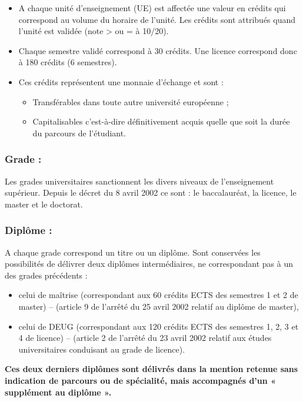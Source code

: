 \documentclass[10pt, a5paper]{report}
\begin{document}
\begin{spacing}{1.5}
\begin{itemize}
\item A chaque unité d’enseignement (UE) est affectée une valeur en crédits qui correspond au volume du horaire de l’unité. Les crédits sont attribués quand l’unité est validée (note > ou = à 10/20).
\item Chaque semestre validé correspond à 30 crédits. Une licence correspond donc à 180 crédits (6 semestres).
\item Ces crédits représentent une monnaie d’échange et sont : 
\begin{itemize}
\item Transférables dans toute autre université européenne ;
\item Capitalisables c’est-à-dire définitivement acquis quelle que soit la durée du parcours de l’étudiant. 
\end{itemize}
\end{itemize}

\subsubsection*{Grade :}

Les grades universitaires sanctionnent les divers niveaux de l’enseignement supérieur. Depuis le décret du 8 avril 2002 ce sont : le baccalauréat, la licence, le master et le doctorat.

\subsubsection*{Diplôme :}

A chaque grade correspond un titre ou un diplôme. Sont conservées les possibilités de délivrer deux diplômes intermédiaires, ne correspondant pas à un des grades précédents :
\begin{itemize}
\item celui de maîtrise (correspondant aux 60 crédits ECTS des semestres 1 et 2 de master) – (article 9 de l’arrêté du 25 avril 2002 relatif au diplôme de master),
\item celui de DEUG (correspondant aux 120 crédits ECTS des semestres 1, 2, 3 et 4 de licence) – (article 2 de l’arrêté du 23 avril 2002 relatif aux études universitaires conduisant au grade de licence).
\end{itemize}

\textbf{Ces deux derniers diplômes sont délivrés dans la mention retenue sans indication de parcours ou de spécialité, mais accompagnés d’un « supplément au diplôme ».}


\end{spacing}
\end{document}
